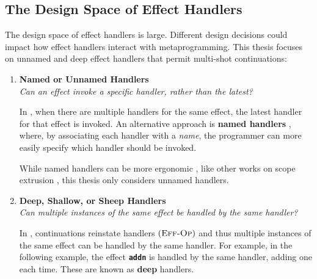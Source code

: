 \subsection{The Design Space of Effect Handlers}\label{subsection:effect-handler-design}
The design space of effect handlers is large. Different design decisions could impact how effect handlers interact with metaprogramming. This thesis focuses on unnamed and deep effect handlers that permit multi-shot continuations:

\renewcommand{\effconfiguration}[2]{{#1}; {#2}}
\renewcommand{\transition}[2]{#1 & \rightarrow & #2}
\newcommand{\rulename}[2]{(\textsc{{#1}-{#2}})}
\newcommand{\reductionRule}[1]{\rulename{Red}{#1}}
\newcommand{\congruenceRule}[1]{\rulename{Cng}{#1}}
\newcommand{\effectRule}[1]{\rulename{Eff}{#1}}

\begin{enumerate} 

 \item \textbf{\textsf{Named or Unnamed Handlers}}\\
        \textit{Can an effect invoke a specific handler, rather than the latest?}
        
        In \efflang{}, when there are multiple handlers for the same effect, the latest handler for that effect is invoked. An alternative approach is \textbf{named handlers} \citep{xie-2022}, where, by associating each handler with a \textit{name}, the programmer can more easily specify which handler should be invoked. 

        While named handlers can be more ergonomic \citep{xie-2022}, like other works on scope extrusion \citep{isoda-24}, this thesis only considers unnamed handlers.

  \item \textbf{\textsf{Deep, Shallow, or Sheep Handlers}}\\
         \textit{Can multiple instances of the same effect be handled by the same handler?}

         In \efflang{}, continuations reinstate handlers $\effectRule{Op}$ and thus multiple instances of the same effect can be handled by the same handler. For example, in the following example, the effect \textbf{\texttt{addn}} is handled by the same handler, adding one each time. These are known as \textbf{deep} handlers.
          

\end{enumerate}
